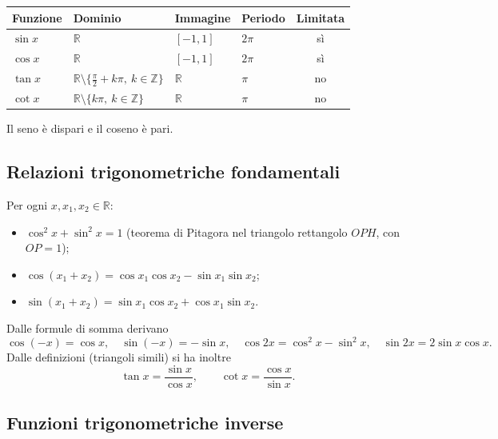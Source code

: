 \documentclass[11pt,a4paper]{article}
\begin{document}
\begin{center}
\renewcommand{\arraystretch}{1.3}
\begin{tabular}{@{}llllc@{}}
\toprule
Funzione & Dominio & Immagine & Periodo & Limitata \\
\midrule
$\sin x$ & $\mathbb{R}$ & $[-1, 1]$ & $2\pi$ & sì \\
$\cos x$ & $\mathbb{R}$ & $[-1, 1]$ & $2\pi$ & sì \\
$\tan x$ & $\mathbb{R} \setminus \{\frac{\pi}{2} + k\pi,\ k \in \mathbb{Z}\}$ & $\mathbb{R}$ & $\pi$ & no \\
$\cot x$ & $\mathbb{R} \setminus \{k\pi,\ k \in \mathbb{Z}\}$ & $\mathbb{R}$ & $\pi$ & no \\
\bottomrule
\end{tabular}
\end{center}

Il seno è dispari e il coseno è pari.

\subsection{Relazioni trigonometriche fondamentali}

Per ogni $x, x_1, x_2 \in \mathbb{R}$:
\begin{itemize}
    \item $\cos^2 x + \sin^2 x = 1$ (teorema di Pitagora nel triangolo rettangolo $OPH$, con $OP = 1$);
    \item $\cos(x_1 + x_2) = \cos x_1 \cos x_2 - \sin x_1 \sin x_2$;
    \item $\sin(x_1 + x_2) = \sin x_1 \cos x_2 + \cos x_1 \sin x_2$.
\end{itemize}
Dalle formule di somma derivano
\[
\cos(-x) = \cos x, \quad \sin(-x) = -\sin x, \quad \cos 2x = \cos^2 x - \sin^2 x, \quad \sin 2x = 2\sin x \cos x.
\]
Dalle definizioni (triangoli simili) si ha inoltre
\[
\tan x = \frac{\sin x}{\cos x}, \qquad \cot x = \frac{\cos x}{\sin x}.
\]

\subsection{Funzioni trigonometriche inverse}
\end{document}
